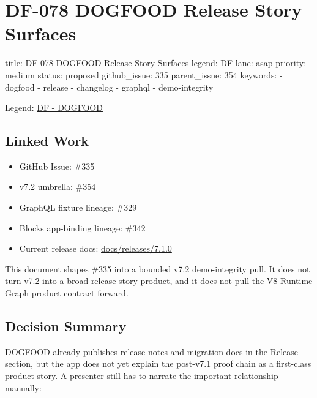 \chapter{DF-078 DOGFOOD Release Story Surfaces}\label{record-118}

\smallskip

\begin{RecordMeta}
title: DF-078 DOGFOOD Release Story Surfaces
legend: DF
lane: asap
priority: medium
status: proposed
github_issue: 335
parent_issue: 354
keywords:
  - dogfood
  - release
  - changelog
  - graphql
  - demo-integrity

\end{RecordMeta}

Legend: \href{https://github.com/flyingrobots/bijou/blob/1853ad902f6bf219326409e7f743a5a1d6517dbc/docs/legends/DF-dogfood-field-guide.md}{DF - DOGFOOD}

\section{Linked Work}\label{record-118-linked-work}

\begin{itemize}
\tightlist
\item
  GitHub Issue: \#335
\item
  v7.2 umbrella: \#354
\item
  GraphQL fixture lineage: \#329
\item
  Blocks app-binding lineage: \#342
\item
  Current release docs: \href{https://github.com/flyingrobots/bijou/blob/cbd70612140e7a450d764b3c7be1c6af878b99bc/docs/releases/7.1.0/README.md}{docs/releases/7.1.0}
\end{itemize}

This document shapes \#335 into a bounded v7.2 demo-integrity pull. It does not turn v7.2 into a broad release-story product, and it does not pull the V8 Runtime Graph product contract forward.

\section{Decision Summary}\label{record-118-decision-summary}

DOGFOOD already publishes release notes and migration docs in the Release section, but the app does not yet explain the post-v7.1 proof chain as a first-class product story. A presenter still has to narrate the important relationship manually:

